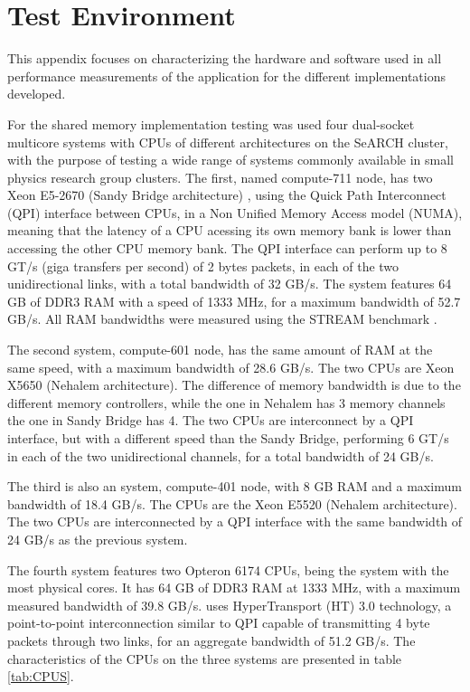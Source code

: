 \appendix
{}
\chapter{Test Environment}
\label{App:TestEnv}

This appendix focuses on characterizing the hardware and software used in all performance measurements of the application for the different implementations developed.

For the shared memory implementation testing was used four dual-socket multicore systems with CPUs of different architectures on the SeARCH cluster, with the purpose of testing a wide range of systems commonly available in small physics research group clusters. The first, named compute-711 node, has two \intel Xeon E5-2670 (Sandy Bridge architecture) \cite{Intel:E52650}, using the Quick Path Interconnect (QPI) interface between CPUs, in a Non Unified Memory Access model (NUMA), meaning that the latency of a CPU acessing its own memory bank is lower than accessing the other CPU memory bank. The QPI interface can perform up to 8 GT/s (giga transfers per second) of 2 bytes packets, in each of the two unidirectional links, with a total bandwidth of 32 GB/s. The system features 64 GB of DDR3 RAM with a speed of 1333 MHz, for a maximum bandwidth of 52.7 GB/s. All RAM bandwidths were measured using the STREAM benchmark \cite{STREAM}.

The second system, compute-601 node, has the same amount of RAM at the same speed, with a maximum bandwidth of 28.6 GB/s. The two CPUs are \intel Xeon X5650 (Nehalem architecture). The difference of memory bandwidth is due to the different memory controllers, while the one in Nehalem has 3 memory channels the one in Sandy Bridge has 4. The two CPUs are interconnect by a QPI interface, but with a different speed than the Sandy Bridge, performing 6 GT/s in each of the two unidirectional channels, for a total bandwidth of 24 GB/s.

The third is also an \intel system, compute-401 node, with 8 GB RAM and a maximum bandwidth of 18.4 GB/s. The CPUs are the Xeon E5520 (Nehalem architecture). The two CPUs are interconnected by a QPI interface with the same bandwidth of 24 GB/s as the previous system.

The fourth system features two \amd Opteron 6174 CPUs, being the system with the most physical cores. It has 64 GB of DDR3 RAM at 1333 MHz, with a maximum measured bandwidth of 39.8 GB/s. \amd uses HyperTransport (HT) 3.0 technology, a point-to-point interconnection similar to QPI capable of transmitting 4 byte packets through two links, for an aggregate bandwidth of 51.2 GB/s. The characteristics of the CPUs on the three systems are presented in table \ref{tab:CPUS}.

